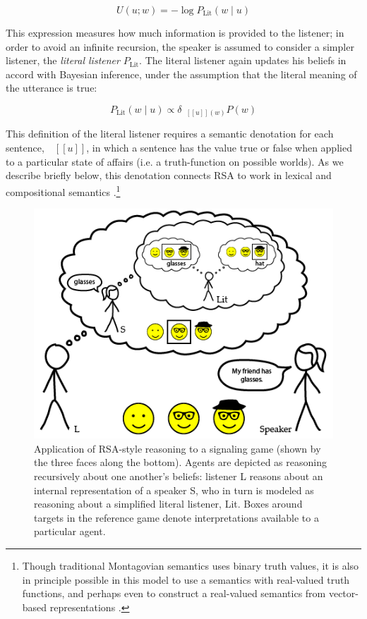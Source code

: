 \documentclass[]{elsarticle}
\newcommand{\denote}[1]{\mbox{ $[\![ #1 ]\!]$}}
\begin{document}
$$U(u;w) = -\log P_{\text{Lit}}(w \mid u)$$

This expression measures how much information is provided to the
listener; in order to avoid an infinite recursion, the speaker is
assumed to consider a simpler listener, the \emph{literal listener}
$P_{\text{Lit}}$. The literal listener again updates his beliefs in
accord with Bayesian inference, under the assumption that the literal
meaning of the utterance is true:

$$P_{\text{Lit}}(w\mid u) \propto \delta_{\denote{u}(w)}P(w)$$

This definition of the literal listener requires a semantic denotation
for each sentence, $\denote{u}$, in which a sentence
has the value true or false when applied to a particular state of
affairs (i.e. a truth-function on possible worlds). As we describe
briefly below, this denotation connects RSA to work in lexical and
compositional semantics \citep{dowty2012}.\footnote{Though traditional Montagovian semantics uses binary truth values, it is also in principle possible in this model to use a semantics with real-valued truth functions, and perhaps even to construct a real-valued semantics from vector-based representations \citep{monroe2015}.}

\begin{figure}[t]
\begin{center}
\includegraphics[width=1.0\textwidth]{images/media/image02.png}
\caption{\label{fig:hg} Application of RSA-style reasoning to a signaling
game (shown by the three faces along the bottom). Agents are depicted as reasoning recursively about one another's beliefs: listener L reasons about an internal representation of a speaker S, who in turn is modeled as reasoning about a simplified literal listener, Lit. Boxes around targets in the reference game denote interpretations available to a particular agent.}
\end{center}
\end{figure}
\end{document}

